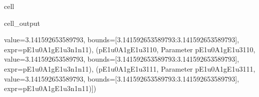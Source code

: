 \documentclass[letterpaper,table,10pt,english]{jupyterBook}
\begin{document}
\begin{sphinxuseclass}{cell}
\begin{sphinxVerbatimOutput}
\begin{sphinxuseclass}{cell_output}
\begin{sphinxVerbatim}[commandchars=\\\{\}]
value=3.141592653589793, bounds=[\PYGZhy{}3.141592653589793:3.141592653589793], expr=\PYGZsq{}p\PYGZus{}E1u\PYGZus{}0\PYGZus{}A1g\PYGZus{}E1u\PYGZus{}3\PYGZus{}n1\PYGZus{}n1\PYGZus{}1\PYGZsq{}\PYGZgt{}), (\PYGZsq{}p\PYGZus{}E1u\PYGZus{}0\PYGZus{}A1g\PYGZus{}E1u\PYGZus{}3\PYGZus{}1\PYGZus{}1\PYGZus{}0\PYGZsq{}, \PYGZlt{}Parameter \PYGZsq{}p\PYGZus{}E1u\PYGZus{}0\PYGZus{}A1g\PYGZus{}E1u\PYGZus{}3\PYGZus{}1\PYGZus{}1\PYGZus{}0\PYGZsq{}, value=3.141592653589793, bounds=[\PYGZhy{}3.141592653589793:3.141592653589793], expr=\PYGZsq{}p\PYGZus{}E1u\PYGZus{}0\PYGZus{}A1g\PYGZus{}E1u\PYGZus{}3\PYGZus{}n1\PYGZus{}n1\PYGZus{}1\PYGZsq{}\PYGZgt{}), (\PYGZsq{}p\PYGZus{}E1u\PYGZus{}0\PYGZus{}A1g\PYGZus{}E1u\PYGZus{}3\PYGZus{}1\PYGZus{}1\PYGZus{}1\PYGZsq{}, \PYGZlt{}Parameter \PYGZsq{}p\PYGZus{}E1u\PYGZus{}0\PYGZus{}A1g\PYGZus{}E1u\PYGZus{}3\PYGZus{}1\PYGZus{}1\PYGZus{}1\PYGZsq{}, value=3.141592653589793, bounds=[\PYGZhy{}3.141592653589793:3.141592653589793], expr=\PYGZsq{}p\PYGZus{}E1u\PYGZus{}0\PYGZus{}A1g\PYGZus{}E1u\PYGZus{}3\PYGZus{}n1\PYGZus{}n1\PYGZus{}1\PYGZsq{}\PYGZgt{})])
\end{sphinxVerbatim}

\end{sphinxuseclass}\end{sphinxVerbatimOutput}

\end{sphinxuseclass}
\end{document}
